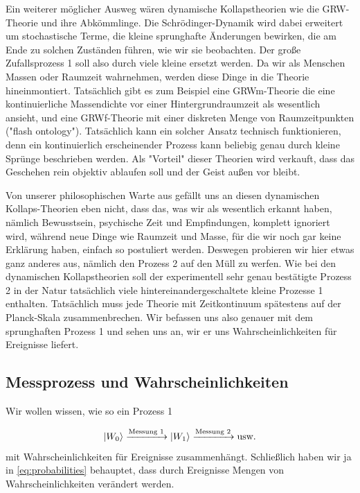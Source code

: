 \documentclass[12pt]{book}
\begin{document}
Ein weiterer möglicher Ausweg wären dynamische Kollapstheorien wie die GRW-Theorie und ihre Abkömmlinge. Die Schrödinger-Dynamik wird dabei erweitert um stochastische Terme, die kleine sprunghafte Änderungen bewirken, die am Ende zu solchen Zuständen führen, wie wir sie beobachten. Der große Zufallsprozess 1 soll also durch viele kleine ersetzt werden. Da wir als Menschen Massen oder Raumzeit wahrnehmen, werden diese Dinge in die Theorie hineinmontiert. Tatsächlich gibt es zum Beispiel eine GRWm-Theorie die eine kontinuierliche Massendichte vor einer Hintergrundraumzeit als wesentlich ansieht, und eine GRWf-Theorie mit einer diskreten Menge von Raumzeitpunkten ("flash ontology"). Tatsächlich kann ein solcher Ansatz technisch funktionieren, denn ein kontinuierlich erscheinender Prozess kann beliebig genau durch kleine Sprünge beschrieben werden. Als "Vorteil" dieser Theorien wird verkauft, dass das Geschehen rein objektiv ablaufen soll und der Geist außen vor bleibt. 

Von unserer philosophischen Warte aus gefällt uns an diesen dynamischen Kollaps-Theorien eben nicht, dass das, was wir als wesentlich erkannt haben, nämlich Bewusstsein, psychische Zeit und Empfindungen, komplett ignoriert wird, während neue Dinge wie Raumzeit und Masse, für die wir noch gar keine Erklärung haben, einfach so postuliert werden. Deswegen probieren wir hier etwas ganz anderes aus, nämlich den Prozess 2 auf den Müll zu werfen. Wie bei den dynamischen Kollapstheorien soll der experimentell sehr genau bestätigte Prozess 2 in der Natur tatsächlich viele hintereinandergeschaltete kleine Prozesse 1 enthalten. Tatsächlich muss jede Theorie mit Zeitkontinuum spätestens auf der Planck-Skala zusammenbrechen. Wir befassen uns also genauer mit dem sprunghaften Prozess 1 und sehen uns an, wir er uns Wahrscheinlichkeiten für Ereignisse liefert.

\subsection{Messprozess und Wahrscheinlichkeiten}

Wir wollen wissen, wie so ein Prozess 1 

\begin{equation} \label{eq:probabilities_qm}
\ket{W_0} \xrightarrow{\textrm{Messung 1}} 
\ket{W_1} \xrightarrow{\textrm{Messung 2}}  \textrm{usw.}
\end{equation}
mit Wahrscheinlichkeiten für Ereignisse zusammenhängt. Schließlich haben wir ja in \ref{eq:probabilities} behauptet, dass durch Ereignisse Mengen von Wahrscheinlichkeiten verändert werden. 
\end{document}
